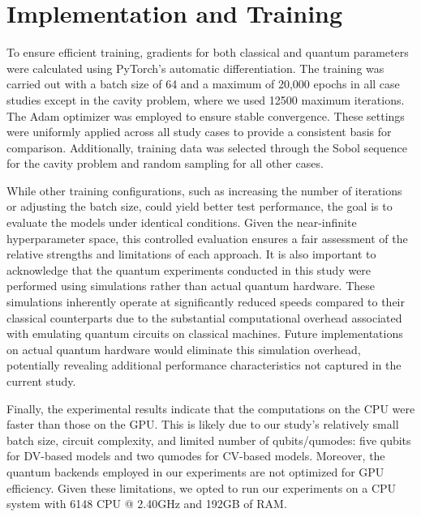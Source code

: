 
\section{Implementation and Training}
\label{sec:experiments}

 To ensure efficient training, gradients for both classical and quantum parameters were calculated using PyTorch's automatic differentiation. The training was carried out with a batch size of 64 and a maximum of 20,000 epochs in all case studies except in the cavity problem, where we used 12500 maximum iterations. The Adam optimizer was employed to ensure stable convergence. These settings were uniformly applied across all study cases to provide a consistent basis for comparison.  Additionally, training data was selected through the Sobol sequence for the cavity problem and random sampling for all other cases.

While other training configurations, such as increasing the number of iterations or adjusting the batch size, could yield better test performance, the goal is to evaluate the models under identical conditions. Given the near-infinite hyperparameter space, this controlled evaluation ensures a fair assessment of the relative strengths and limitations of each approach. It is also important to acknowledge that the quantum experiments conducted in this study were performed using simulations rather than actual quantum hardware. These simulations inherently operate at significantly reduced speeds compared to their classical counterparts due to the substantial computational overhead associated with emulating quantum circuits on classical machines. Future implementations on actual quantum hardware would eliminate this simulation overhead, potentially revealing additional performance characteristics not captured in the current study.


Finally, the experimental results indicate that the computations on the CPU were faster than those on the GPU. This is likely due to our study's relatively small batch size, circuit complexity, and limited number of qubits/qumodes: five qubits for DV-based models and two qumodes for CV-based models. Moreover, the quantum backends employed in our experiments are not optimized for GPU efficiency. Given these limitations, we opted to run our experiments on a CPU system with 6148 CPU @ 2.40GHz and 192GB of RAM.

